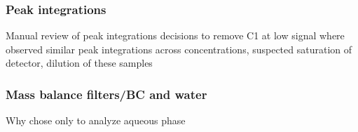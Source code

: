 \subsubsection{Peak integrations}
Manual review of peak integrations
decisions to remove C1 at low signal
where observed similar peak integrations across concentrations, suspected saturation of detector, dilution of these samples

\subsubsection{Mass balance filters/BC and water}
Why chose only to analyze aqueous phase



